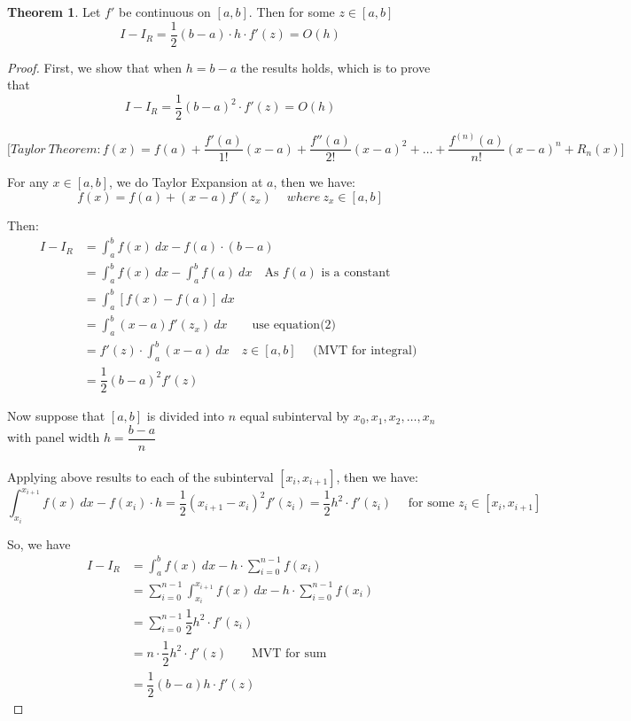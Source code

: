 \documentclass [9 pt]{article}
\theoremstyle{definition}
\newtheorem{theorem}{Theorem}
\begin{document}
\begin{theorem}
	Let $f'$ be continuous on $[a, b]$. Then for some $z \in [a, b]$
	$$I - I_R = \dfrac{1}{2} (b - a)\cdot h \cdot f'(z) = O(h) $$
\end{theorem}
\begin{proof}
	First, we show that when $h = b - a$ the results holds, which is to prove that 
	\begin{equation}
		I - I_R = \dfrac{1}{2} (b - a)^2 \cdot f'(z) = O(h)
	\end{equation}
	
	$$\Bigg[ Taylor\ Theorem: f(x) = f(a) + \dfrac{f'(a)}{1!}(x - a) + \dfrac{f''(a)}{2!}(x - a)^2 + \ldots + \dfrac{f^{(n)} (a)}{n!}(x - a)^n + R_n(x)  \Bigg]$$
	
	
	For any $x \in [a, b]$, we do Taylor Expansion at $a$, then we have:
	\begin{equation}
	f(x) = f(a) + (x - a) f'(z_x)\quad\  where \ z_x \in [a, b] 	
	\end{equation} 
	
	Then: 
	\begin{align*}
		I - I_R 
		&= \int_{a}^{b} f(x)\ dx - f(a)\cdot (b - a)\\
		&= \int_{a}^{b} f(x)\ dx - \int_{a}^b f(a)\ dx \quad \text{As $f(a)$ is a constant}  \\
		&= \int_{a}^b [f(x) - f(a)]\ dx \\
		&= \int_{a}^b (x - a) f'(z_x)\ dx \quad \quad \text{use equation(2)} \\
		&= f'(z) \cdot \int_{a}^b (x - a)\ dx \quad z \in [a, b] \quad \text{ (MVT for integral) }\\
		&= \dfrac{1}{2}(b - a)^2 f'(z)
	\end{align*}
	
	Now suppose that $[a, b]$ is divided into $n$ equal subinterval by $x_0, x_1, x_2, \ldots , x_n$ with panel width $h = \dfrac{b - a}{n}$\\
	\\
	Applying above results to each of the subinterval $[x_i, x_{i+1}]$, then we have:
	\begin{equation}
		\int_{x_i}^{x_{i+1}} f(x)\ dx - f(x_i)\cdot h = \dfrac{1}{2} (x_{i + 1} - x_{i})^2 f'(z_i) = \dfrac{1}{2} h^2\cdot f'(z_i)\quad \text{ for some } z_i \in [x_i, x_{i+1}]
	\end{equation} 
	
	So, we have 
	\begin{align*}
		I - I_R 
		&= \int_{a}^{b} f(x)\ dx - h\cdot \sum_{i = 0}^{n - 1}f(x_i)\\
		&= \sum_{i = 0}^{n - 1} \int_{x_i}^{x_{i+1}} f(x)\ dx - h \cdot \sum_{i = 0}^{n - 1}f(x_i)\\
		&= \sum_{i = 0}^{n - 1} \dfrac{1}{2}h^2 \cdot f'(z_i)\\
		&= n \cdot \dfrac{1}{2}h^2 \cdot f'(z) \quad \quad \text{MVT for sum} \\
		&= \dfrac{1}{2} (b - a) h \cdot f'(z)
	\end{align*}
	
\end{proof}
\end{document}
